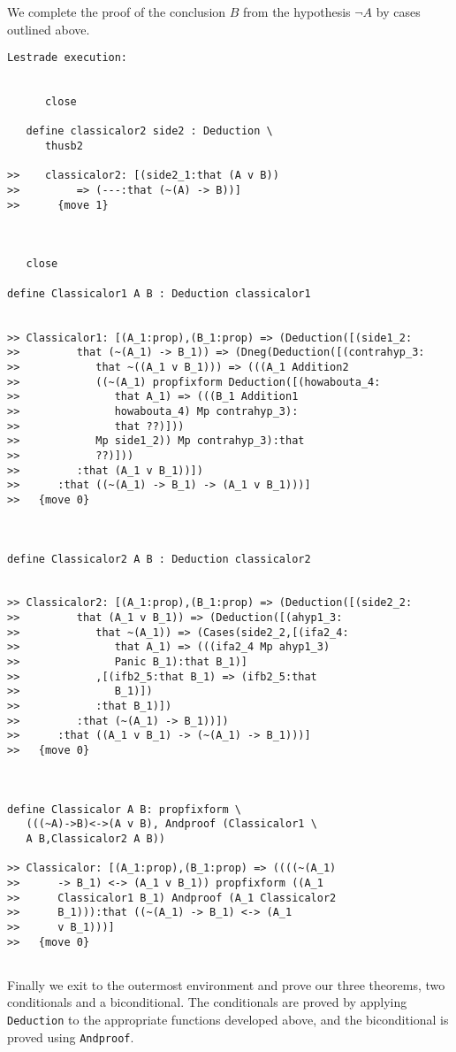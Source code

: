 \documentclass[12pt]{article}
\begin{document}
We complete the proof of the conclusion $B$ from the hypothesis $\neg A$ by cases outlined above.

\begin{verbatim}Lestrade execution:


      close

   define classicalor2 side2 : Deduction \
      thusb2

>>    classicalor2: [(side2_1:that (A v B))
>>         => (---:that (~(A) -> B))]
>>      {move 1}



   close

define Classicalor1 A B : Deduction classicalor1


>> Classicalor1: [(A_1:prop),(B_1:prop) => (Deduction([(side1_2:
>>         that (~(A_1) -> B_1)) => (Dneg(Deduction([(contrahyp_3:
>>            that ~((A_1 v B_1))) => (((A_1 Addition2
>>            ((~(A_1) propfixform Deduction([(howabouta_4:
>>               that A_1) => (((B_1 Addition1
>>               howabouta_4) Mp contrahyp_3):
>>               that ??)]))
>>            Mp side1_2)) Mp contrahyp_3):that
>>            ??)]))
>>         :that (A_1 v B_1))])
>>      :that ((~(A_1) -> B_1) -> (A_1 v B_1)))]
>>   {move 0}



define Classicalor2 A B : Deduction classicalor2


>> Classicalor2: [(A_1:prop),(B_1:prop) => (Deduction([(side2_2:
>>         that (A_1 v B_1)) => (Deduction([(ahyp1_3:
>>            that ~(A_1)) => (Cases(side2_2,[(ifa2_4:
>>               that A_1) => (((ifa2_4 Mp ahyp1_3)
>>               Panic B_1):that B_1)]
>>            ,[(ifb2_5:that B_1) => (ifb2_5:that
>>               B_1)])
>>            :that B_1)])
>>         :that (~(A_1) -> B_1))])
>>      :that ((A_1 v B_1) -> (~(A_1) -> B_1)))]
>>   {move 0}



define Classicalor A B: propfixform \
   (((~A)->B)<->(A v B), Andproof (Classicalor1 \
   A B,Classicalor2 A B))

>> Classicalor: [(A_1:prop),(B_1:prop) => ((((~(A_1)
>>      -> B_1) <-> (A_1 v B_1)) propfixform ((A_1
>>      Classicalor1 B_1) Andproof (A_1 Classicalor2
>>      B_1))):that ((~(A_1) -> B_1) <-> (A_1
>>      v B_1)))]
>>   {move 0}


\end{verbatim}

Finally we exit to the outermost environment and prove our three theorems, two conditionals and a biconditional.  The conditionals are proved by applying
{\tt Deduction} to the appropriate functions developed above, and the biconditional is proved using {\tt Andproof}.
\end{document}
